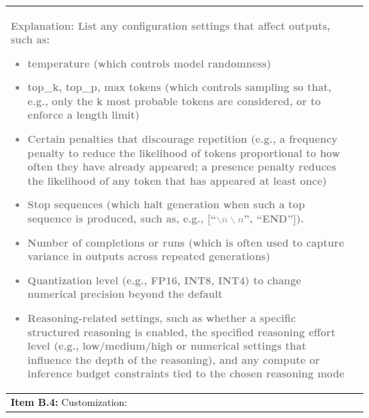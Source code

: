 \documentclass[12pt]{article}
\begin{document}
\begin{longtable}{|p{}|p{}|}
\textcolor{gray}{{\footnotesize
\textbf{Explanation:}  List any configuration settings that affect outputs, such as:
\begin{itemize}[leftmargin=*]\setlength{\itemsep}{0pt}\setlength{\parskip}{0pt}
    \item \textbf{temperature} (which controls model randomness)
    \item \textbf{top\_k, top\_p, max tokens} (which controls sampling so that, e.g., only the k most probable tokens are considered, or to enforce a length limit)
    \item Certain \textbf{penalties} that discourage repetition (e.g., a frequency penalty to reduce the likelihood of tokens proportional to how often they have already appeared; a presence penalty reduces the likelihood of any token that has appeared at least once)
    \item \textbf{Stop sequences} (which halt generation when such a top sequence is produced, such as, e.g., [``$\backslash n \backslash n$'', ``END'']).
    \item \textbf{Number of completions or runs} (which is often used to capture variance in outputs across repeated generations)
    \item \textbf{Quantization level} (e.g., FP16, INT8, INT4) to change numerical precision beyond the default
    \item \textbf{Reasoning}-related settings, such as whether a specific structured reasoning is enabled, the specified reasoning effort level (e.g., low/medium/high or numerical settings that influence the depth of the reasoning), and any compute or inference budget constraints tied to the chosen reasoning mode
\end{itemize}
} } &   \\
\hline
\textbf{Item B.4:} Customization:


\end{longtable}
\end{document}
